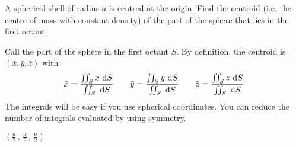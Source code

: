 \begin{question}
A spherical shell of radius $a$ is centred at the origin.
Find the centroid (i.e. the centre of mass with constant density)
of the part of the sphere that lies in the first octant.
\end{question}

\begin{hint}
Call the part of the sphere in the first octant $S$.
By definition, the centroid is  $(\bar x,\bar y,\bar z)$ with
\begin{equation*}
\bar x = \frac{\dblInt_S x\ \dee{S}}{\dblInt_S \ \dee{S}}\qquad
\bar y = \frac{\dblInt_S y\ \dee{S}}{\dblInt_S \ \dee{S}}\qquad
\bar z = \frac{\dblInt_S z\ \dee{S}}{\dblInt_S \ \dee{S}}
\end{equation*}
The integrals will be easy if you use spherical coordinates.
You can reduce the number of integrals evaluated by using symmetry.
\end{hint}

\begin{answer} 
$\left(\frac{a}{2}\,,\,\frac{a}{2}\,,\,\frac{a}{2}\right)$
\end{answer}

